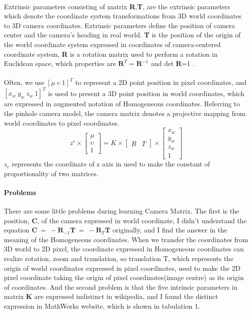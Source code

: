 \documentclass{article}
\begin{document}
\paragraph{} Extrinsic parameters consisting of matrix \textbf{R},\textbf{T}, are the extrinsic parameters which denote the coordinate system transformations from 3D world coordinates to 3D camera coordinates. Extrinsic parameters define the position of camera center and the camera's heading in real world. \textbf{T} is the position of the origin of the world coordinate system expressed in coordinates of camera-centered coordinate system, \textbf{R} is a rotation matrix used to perform a rotation in Euclidean space, which properties are $\mathbf{R}^T = \mathbf{R}^{-1}$ and det \textbf{R}=1 \cite{RotationMatrix}.
\paragraph{} Often, we use $[\mu\ \upsilon\ 1]^T$ to represent a 2D point position in pixel coordinates, and $[x_w\ y_w\ z_w\ 1]^T$ is used to present a 3D point position in world coordinates, which are expressed in augmented notation of Homogeneous coordinates. Referring to the pinhole camera model, the camera matrix denotes a projective mapping from world coordinates to pixel coordinates.
\begin{equation}
z^c \times \left[\begin{array}{c}
\mu\\
\upsilon\\
1
\end{array}
\right] = K \times \left[\begin{array}{cc}R & T \end{array}\right] \times \left[\begin{array}{c}
x_w\\
y_w\\
z_w\\
1
\end{array}
\right]
\end{equation}
$z_c$ represents the coordinate of z axis in used to make the constant of proportionality of two matrices\cite{ScaleFactor}.
\paragraph{Problems} There are some little problems during learning Camera Matrix. The first is the position, \textbf{C}, of the camera expressed in world coordinate, I didn't understand the equation $\mathbf{C}\ =\ -\mathbf{R}_{-1}\mathbf{T}\ =\ -\mathbf{R}_T\mathbf{T}$ originally, and I find the answer in the meaning of the Homogeneous coordinates. When we transfer the coordinates from 3D world to 2D pixel, the coordinate expressed in Homogeneous coordinates can realize rotation, zoom and translation, so translation T, which represents the origin of world coordinates expressed in pixel coordinates, used to make the 2D pixel coordinate taking the origin of pixel coordinates(image centre) as its origin of coordinates. And the second problem is that the five intrinsic parameters in matrix \textbf{K} are expressed indistinct in wikipedia, and I found the distinct expression in MathWorks website\cite{Intrinsic}, which is shown in tabulation 1.
\end{document}

